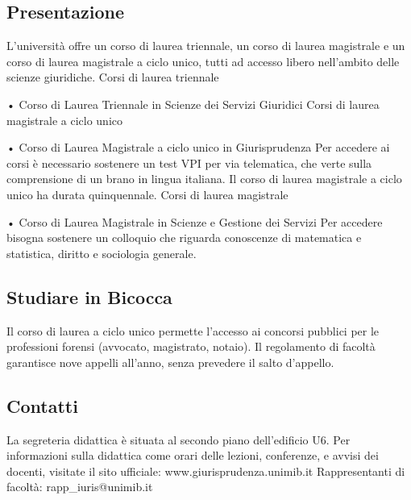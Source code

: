 
\subsection{Presentazione}
L'università offre un corso di laurea triennale, un corso di laurea magistrale e un corso di laurea magistrale a ciclo unico, tutti ad accesso libero nell'ambito delle scienze giuridiche.
Corsi di laurea triennale
     \item• Corso di Laurea Triennale in Scienze dei Servizi Giuridici 
Corsi di laurea magistrale a ciclo unico
     \item• Corso di Laurea Magistrale a ciclo unico in Giurisprudenza 
Per accedere ai corsi è necessario sostenere un test VPI per via telematica, che verte sulla comprensione di un brano in lingua italiana. Il corso di laurea magistrale a ciclo unico ha durata quinquennale. 
Corsi di laurea magistrale
     \item• Corso di Laurea Magistrale in Scienze e Gestione dei Servizi 
Per accedere bisogna sostenere un colloquio che riguarda conoscenze di matematica e statistica, diritto e sociologia generale. 

\subsection{Studiare in Bicocca}
Il corso di laurea a ciclo unico permette l'accesso ai concorsi pubblici per le professioni forensi (avvocato, magistrato, notaio). Il regolamento di facoltà garantisce nove appelli all'anno, senza prevedere il salto d'appello. 

\subsection{Contatti}
La segreteria didattica è situata al secondo piano dell'edificio U6. Per informazioni sulla didattica come orari delle lezioni, conferenze, e avvisi dei docenti, visitate il sito ufficiale: www.giurisprudenza.unimib.it 
Rappresentanti di facoltà: rapp\_iuris@unimib.it 
